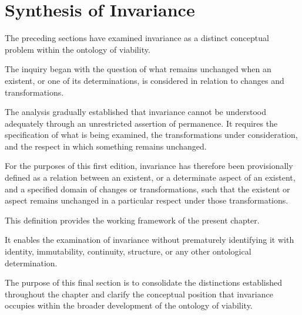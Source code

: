 
\section{Synthesis of Invariance}
\label{sec:synthesis-of-invariance}


The preceding sections have examined invariance
as a distinct conceptual problem within the
ontology of viability.

The inquiry began with the question of what
remains unchanged when an existent, or one
of its determinations, is considered in relation
to changes and transformations.

The analysis gradually established that
invariance cannot be understood adequately
through an unrestricted assertion of permanence.
It requires the specification of what is being
examined, the transformations under consideration,
and the respect in which something remains
unchanged.

For the purposes of this first edition, invariance
has therefore been provisionally defined as a
relation between an existent, or a determinate
aspect of an existent, and a specified domain
of changes or transformations, such that the
existent or aspect remains unchanged in a
particular respect under those transformations.

This definition provides the working framework
of the present chapter.

It enables the examination of invariance without
prematurely identifying it with identity,
immutability, continuity, structure, or any
other ontological determination.

The purpose of this final section is to consolidate
the distinctions established throughout the
chapter and clarify the conceptual position
that invariance occupies within the broader
development of the ontology of viability.


